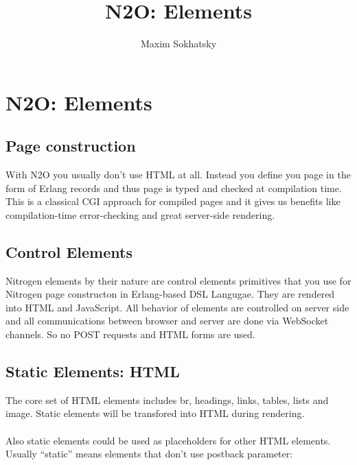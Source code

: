 \documentclass[11pt]{article}
\begin{document}
\title{N2O: Elements}
\author{Maxim Sokhatsky}

\paragraph{}
\section*{N2O: Elements}

\subsection*{Page construction}
With N2O you usually don't use HTML at all. Instead you define you page
in the form of Erlang records and thus page is typed and checked at compilation time.
This is a classical CGI approach for compiled pages and it gives us benefits like
compilation-time error-checking and great server-side rendering.

\subsection*{Control Elements}
Nitrogen elements by their nature are control elements primitives
that you use for Nitrogen page constructon in Erlang-based DSL Langugae.
They are rendered into HTML and JavaScript.
All behavior of elements are controlled on server side and all communications
between browser and server are done via WebSocket channels.
So no POST requests and HTML forms are used.

\subsection*{Static Elements: HTML}
The core set of HTML elements includes br, headings, links, tables, lists and image.
Static elements will be transfored into HTML during rendering.
\paragraph{}
Also static elements could be used as placeholders for other HTML elements.
Usually ``static'' means elements that don't use postback parameter:
\end{document}
